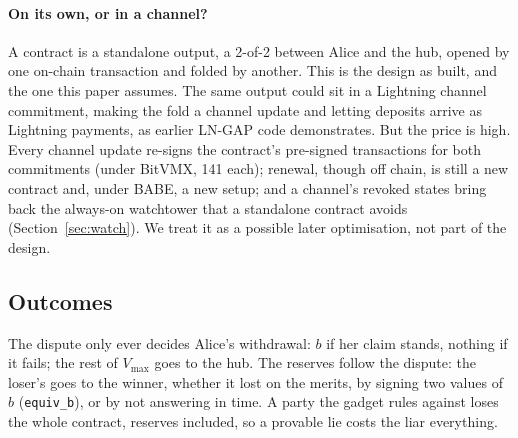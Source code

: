 \documentclass[11pt]{article}
\newcommand{\vmax}{V_{\max}}
\newcommand{\tx}[1]{\texttt{#1}}
\begin{document}
\paragraph{On its own, or in a channel?} A contract is a standalone
output, a 2-of-2 between Alice and the hub, opened by one on-chain
transaction and folded by another. This is the design as built, and the
one this paper assumes. The same output could sit in a Lightning channel
commitment, making the fold a channel update and letting deposits arrive
as Lightning payments, as earlier LN-GAP code demonstrates. But the
price is high. Every channel update re-signs the contract's pre-signed
transactions for both commitments (under BitVMX, 141 each); renewal,
though off chain, is still a new contract and, under BABE, a new setup;
and a channel's revoked states bring back the always-on watchtower that a
standalone contract avoids (Section~\ref{sec:watch}). We treat it as a
possible later optimisation, not part of the design.

\subsection{Outcomes}
\label{sec:outcomes}

The dispute only ever decides Alice's withdrawal: $b$ if her claim
stands, nothing if it fails; the rest of $\vmax$ goes to the hub. The reserves follow the dispute: the loser's goes to the winner, whether
it lost on the merits, by signing two values of $b$ (\tx{equiv\_b}), or
by not answering in time. A party the gadget rules against loses the
whole contract, reserves included, so a provable lie costs the liar
everything.
\end{document}
